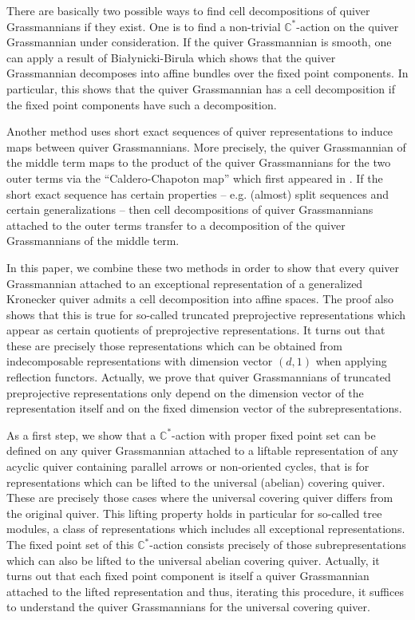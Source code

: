 \documentclass{amsart}
\numberwithin{equation}{section}
\newcommand{\CC}{\mathbb{C}}
\begin{document}
There are basically two possible ways to find cell decompositions of quiver Grassmannians if they exist.
One is to find a non-trivial $\CC^*$-action on the quiver Grassmannian under consideration.
If the quiver Grassmannian is smooth, one can apply a result of Bia\l{}ynicki-Birula \cite{bb} which shows that the quiver Grassmannian decomposes into affine bundles over the fixed point components.
In particular, this shows that the quiver Grassmannian has a cell decomposition if the fixed point components have such a decomposition.

Another method uses short exact sequences of quiver representations to induce maps between quiver Grassmannians.
More precisely, the quiver Grassmannian of the middle term maps to the product of the quiver Grassmannians for the two outer terms via the ``Caldero-Chapoton map'' which first appeared in \cite{cc}. 
If the short exact sequence has certain properties -- e.g. (almost) split sequences and certain generalizations -- then cell decompositions of quiver Grassmannians attached to the outer terms transfer to a decomposition of the quiver Grassmannians of the middle term.

In this paper, we combine these two methods in order to show that every quiver Grassmannian attached to an exceptional representation of a generalized Kronecker quiver admits a cell decomposition into affine spaces.
The proof also shows that this is true for so-called truncated preprojective representations which appear as certain quotients of preprojective representations.
It turns out that these are precisely those representations which can be obtained from indecomposable representations with dimension vector $(d,1)$ when applying reflection functors.
Actually, we prove that quiver Grassmannians of truncated preprojective representations only depend on the dimension vector of the representation itself and on the fixed dimension vector of the subrepresentations.

As a first step, we show that a $\CC^*$-action with proper fixed point set can be defined on any quiver Grassmannian attached to a liftable representation of any acyclic quiver containing parallel arrows or non-oriented cycles, that is for representations which can be lifted to the universal (abelian) covering quiver.
These are precisely those cases where the universal covering quiver differs from the original quiver.
This lifting property holds in particular for so-called tree modules, a class of representations which includes all exceptional representations.
The fixed point set of this $\CC^*$-action consists precisely of those subrepresentations which can also be lifted to the universal abelian covering quiver.
Actually, it turns out that each fixed point component is itself a quiver Grassmannian attached to the lifted representation and thus, iterating this procedure, it suffices to understand the quiver Grassmannians for the universal covering quiver.
\end{document}
